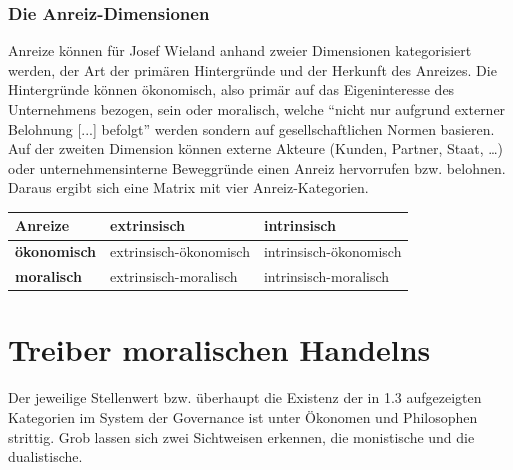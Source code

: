 \documentclass[12pt]{article}
\begin{document}
\section{Die Anreiz-Dimensionen}
Anreize können für Josef Wieland anhand zweier Dimensionen kategorisiert werden, der Art der primären Hintergründe und der Herkunft des Anreizes. Die Hintergründe können ökonomisch, also primär auf das Eigeninteresse des Unternehmens bezogen, sein oder moralisch, welche “nicht nur aufgrund externer Belohnung [...] befolgt” werden sondern auf gesellschaftlichen Normen basieren. Auf der zweiten Dimension können externe Akteure (Kunden, Partner, Staat, …) oder unternehmensinterne Beweggründe einen Anreiz hervorrufen bzw. belohnen. Daraus ergibt sich eine Matrix mit vier Anreiz-Kategorien.
\begin{center}
\begin{tabular}{|p{3cm}|p{5cm}|p{5cm}|}
\hline
Anreize & \textbf{extrinsisch} & \textbf{intrinsisch}\\\hline
\textbf{ökonomisch} & extrinsisch-ökonomisch & intrinsisch-ökonomisch\\\hline
\textbf{moralisch} & extrinsisch-moralisch & intrinsisch-moralisch\\\hline
\end{tabular}
\end{center}
\part{Treiber moralischen Handelns}
Der jeweilige Stellenwert bzw. überhaupt die Existenz der in 1.3 aufgezeigten Kategorien im System der Governance ist unter Ökonomen und Philosophen strittig. Grob lassen sich zwei Sichtweisen erkennen, die monistische und die dualistische.
\end{document}

